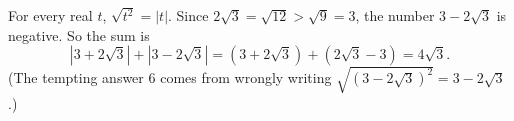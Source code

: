 For every real $t$, $\sqrt{t^2}=|t|$. Since $2\sqrt3=\sqrt{12}>\sqrt9=3$, the number $3-2\sqrt3$ is negative. So the sum is
\[\left|3+2\sqrt3\right|+\left|3-2\sqrt3\right|=\left(3+2\sqrt3\right)+\left(2\sqrt3-3\right)=\boxed{4\sqrt3}.\]
(The tempting answer $6$ comes from wrongly writing $\sqrt{\left(3-2\sqrt3\right)^2}=3-2\sqrt3$.)
